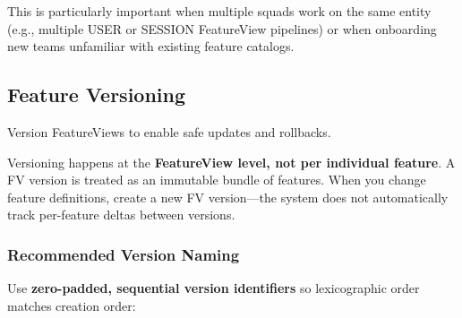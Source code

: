 \documentclass[
  letterpaper,
  DIV=11,
  numbers=noendperiod]{scrreprt}
\begin{document}
\begin{tcolorbox}[enhanced jigsaw, title=\textcolor{quarto-callout-tip-color}{\faLightbulb}\hspace{0.5em}{Field Tip}, colbacktitle=quarto-callout-tip-color!10!white, rightrule=.15mm, arc=.35mm, colframe=quarto-callout-tip-color-frame, left=2mm, bottomtitle=1mm, toptitle=1mm, breakable, bottomrule=.15mm, opacityback=0, titlerule=0mm, toprule=.15mm, opacitybacktitle=0.6, colback=white, coltitle=black, leftrule=.75mm]

This is particularly important when multiple squads work on the same
entity (e.g., multiple USER or SESSION FeatureView pipelines) or when
onboarding new teams unfamiliar with existing feature catalogs.

\end{tcolorbox}

\hypertarget{sec-versioning}{%
\subsection{Feature Versioning}\label{sec-versioning}}

Version FeatureViews to enable safe updates and rollbacks.

\begin{tcolorbox}[enhanced jigsaw, title=\textcolor{quarto-callout-important-color}{\faExclamation}\hspace{0.5em}{Key Insight}, colbacktitle=quarto-callout-important-color!10!white, rightrule=.15mm, arc=.35mm, colframe=quarto-callout-important-color-frame, left=2mm, bottomtitle=1mm, toptitle=1mm, breakable, bottomrule=.15mm, opacityback=0, titlerule=0mm, toprule=.15mm, opacitybacktitle=0.6, colback=white, coltitle=black, leftrule=.75mm]

Versioning happens at the \textbf{FeatureView level, not per individual
feature}. A FV version is treated as an immutable bundle of features.
When you change feature definitions, create a new FV version---the
system does not automatically track per-feature deltas between versions.

\end{tcolorbox}

\hypertarget{recommended-version-naming}{%
\subsubsection{Recommended Version
Naming}\label{recommended-version-naming}}

Use \textbf{zero-padded, sequential version identifiers} so
lexicographic order matches creation order:
\end{document}
